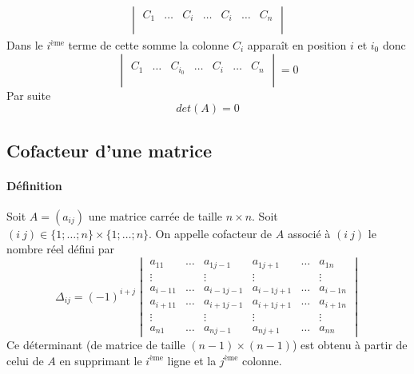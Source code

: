\begin{itemize}
\begin{eqnarray*}
\begin{vmatrix}
          C_1 & \ldots & C_{i} & \ldots & C_i & \ldots & C_n 
        \\ \\ \end{vmatrix}
    \end{eqnarray*}
    Dans le $i^{\text{ème}}$ terme de cette somme la colonne $C_i$ apparaît en position $i$ et $i_0$ donc
    $$\begin{vmatrix} \\ C_1 & \ldots & C_{i_0} & \ldots & C_i & \ldots & C_n \\ \\ \end{vmatrix} = 0$$
    Par suite
    $$det(A) = 0$$
\end{itemize}

%
\subsection{Cofacteur d'une matrice}
%
\paragraph{Définition} Soit $A = (a_{ij})$ une matrice carrée de taille $n\times n$. Soit $(i ~ j) \in \{1; \ldots; n\} \times \{1; \ldots; n \}$. On appelle cofacteur de $A$ associé à $(i ~ j)$ le nombre réel défini par
$$\Delta_{ij} = (-1)^{i+j} \begin{vmatrix}
  a_{11} & \ldots & a_{1 j-1} & a_{1 j+1} & \ldots & a_{1n} \\
  \vdots &  & \vdots & \vdots &  & \vdots \\
  a_{i-1 1} & \ldots & a_{i-1 j-1} & a_{i-1 j+1} & \ldots & a_{i-1 n} \\
  a_{i+1 1} & \ldots & a_{i+1 j-1} & a_{i+1 j+1} & \ldots & a_{i+1 n} \\
  \vdots &  & \vdots & \vdots &  & \vdots \\
  a_{n 1} & \ldots & a_{n j-1} & a_{n j+1} & \ldots & a_{nn}
\end{vmatrix}$$
Ce déterminant (de matrice de taille $(n-1) \times (n-1)$) est obtenu à partir de celui de $A$ en supprimant le $i^{\text{ème}}$ ligne et la $j^{\text{ème}}$ colonne.

